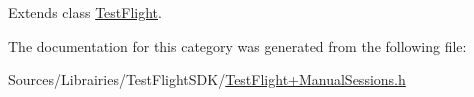 Extends class \hyperlink{interface_test_flight_a2ec362e403cf3b736409f70a0cb647aa}{Test\-Flight}.



The documentation for this category was generated from the following file\-:\begin{DoxyCompactItemize}
\item 
Sources/\-Librairies/\-Test\-Flight\-S\-D\-K/\hyperlink{_test_flight_09_manual_sessions_8h}{Test\-Flight+\-Manual\-Sessions.\-h}\end{DoxyCompactItemize}

